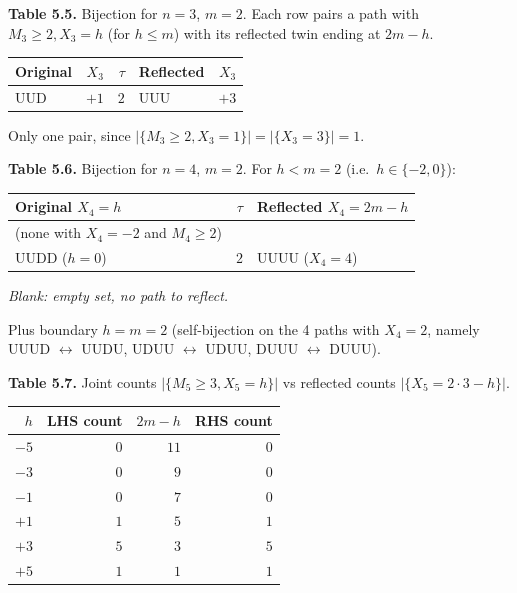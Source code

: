 \documentclass[
  10pt,
  twoside]{book}
\newcounter{none} %
\begin{document}
\textbf{Table 5.5.} Bijection for \(n = 3\), \(m = 2\). Each row pairs a
path with \(M_3 \ge 2, X_3 = h\) (for \(h \le m\)) with its reflected
twin ending at \(2m - h\).

{\def\LTcaptype{none} %
\begin{table}[H]
\centering
\begin{tabular}{|l|r|r|l|r|}
\toprule
Original & \(X_3\) & \(\tau\) & Reflected & \(X_3\) \\
\midrule



UUD & \(+1\) & \(2\) & UUU & \(+3\) \\
\bottomrule
\end{tabular}
\end{table}
}

Only one pair, since \(|\{M_3 \ge 2, X_3 = 1\}| = |\{X_3 = 3\}| = 1\).

\textbf{Table 5.6.} Bijection for \(n = 4\), \(m = 2\). For
\(h < m = 2\) (i.e.~\(h \in \{-2, 0\}\)):

{\def\LTcaptype{none} %
\begin{table}[H]
\centering
\begin{tabular}{|l|r|l|}
\toprule
Original \(X_4 = h\) & \(\tau\) & Reflected \(X_4 = 2m - h\) \\
\midrule



(none with \(X_4 = -2\) and \(M_4 \ge 2\)) & & \\
UUDD (\(h = 0\)) & \(2\) & UUUU (\(X_4 = 4\)) \\
\bottomrule
\end{tabular}
\end{table}
}

\emph{Blank: empty set, no path to reflect.}

Plus boundary \(h = m = 2\) (self-bijection on the 4 paths with
\(X_4 = 2\), namely UUUD \(\leftrightarrow\) UUDU, UDUU
\(\leftrightarrow\) UDUU, DUUU \(\leftrightarrow\) DUUU).

\textbf{Table 5.7.} Joint counts \(\lvert\{M_5 \ge 3, X_5 = h\}\rvert\)
vs reflected counts \(\lvert\{X_5 = 2 \cdot 3 - h\}\rvert\).

{\def\LTcaptype{none} %
\begin{table}[H]
\centering
\begin{tabular}{|r|r|r|r|}
\toprule
\(h\) & LHS count & \(2m - h\) & RHS count \\
\midrule



\(-5\) & \(0\) & \(11\) & \(0\) \\
\(-3\) & \(0\) & \(9\) & \(0\) \\
\(-1\) & \(0\) & \(7\) & \(0\) \\
\(+1\) & \(1\) & \(5\) & \(1\) \\
\(+3\) & \(5\) & \(3\) & \(5\) \\
\(+5\) & \(1\) & \(1\) & \(1\) \\
\bottomrule
\end{tabular}
\end{table}
}
\end{document}
